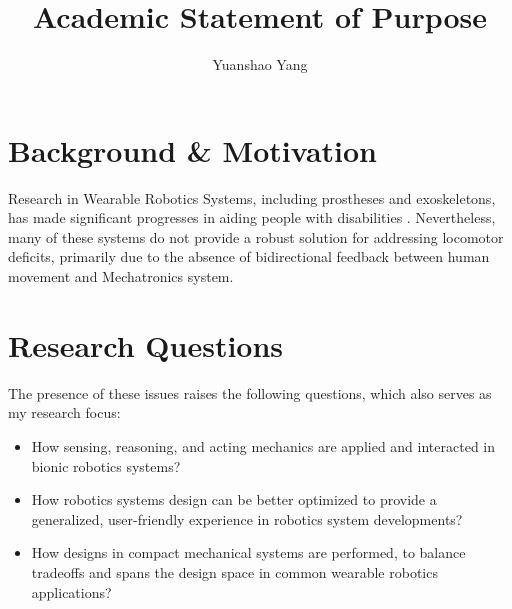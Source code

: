 \documentclass[8pt]{article}
\title{Academic Statement of Purpose}
\author{Yuanshao Yang}
\affil{Department of Mechanical Engineering, Univereity of Michigan}
\date{}
\begin{document}
\maketitle


\section{Background \& Motivation}



Research in Wearable Robotics Systems, including prostheses and exoskeletons, has made significant progresses in aiding people with disabilities \cite{ProsthesisOverview}. Nevertheless, many of these systems do not provide a robust solution for addressing locomotor deficits, primarily due to the absence of bidirectional feedback between human movement and Mechatronics system.

\section{Research Questions}


The presence of these issues raises the following questions, which also serves as my research focus: 

\begin{itemize}
            
    
    \item {How sensing, reasoning, and acting mechanics are applied and interacted in bionic robotics systems?}
    \item {How robotics systems design can be better optimized to provide a generalized, user-friendly experience in robotics system developments?}
    \item {How designs in compact mechanical systems are performed, to balance tradeoffs and spans the design space in common wearable robotics applications?}
    
\end{itemize}
\end{document}
